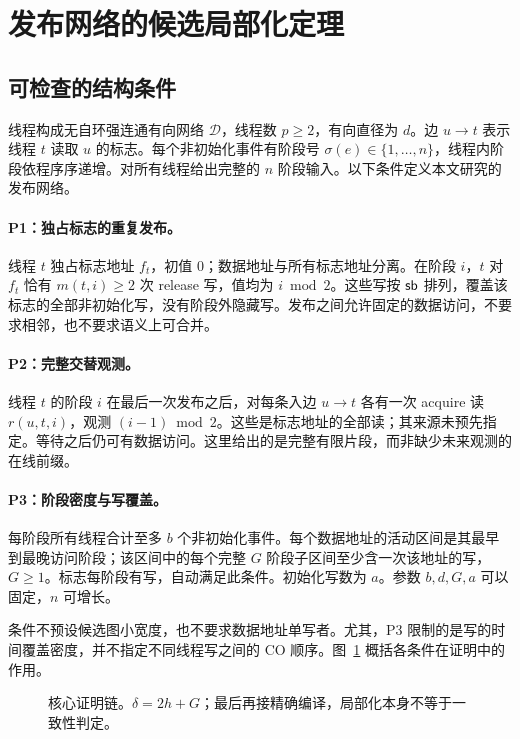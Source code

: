 \section{发布网络的候选局部化定理}\label{sec:theorem}
\subsection{可检查的结构条件}
线程构成无自环强连通有向网络 $\mathcal D$，线程数 $p\ge2$，有向直径为 $d$。边 $u\to t$ 表示线程 $t$ 读取 $u$ 的标志。每个非初始化事件有阶段号 $\sigma(e)\in\{1,\ldots,n\}$，线程内阶段依程序序递增。对所有线程给出完整的 $n$ 阶段输入。以下条件定义本文研究的发布网络。

\paragraph{P1：独占标志的重复发布。}
线程 $t$ 独占标志地址 $f_t$，初值 0；数据地址与所有标志地址分离。在阶段 $i$，$t$ 对 $f_t$ 恰有 $m(t,i)\ge2$ 次 release 写，值均为 $i\bmod2$。这些写按 $\mathsf{sb}$ 排列，覆盖该标志的全部非初始化写，没有阶段外隐藏写。发布之间允许固定的数据访问，不要求相邻，也不要求语义上可合并。

\paragraph{P2：完整交替观测。}
线程 $t$ 的阶段 $i$ 在最后一次发布之后，对每条入边 $u\to t$ 各有一次 acquire 读 $r(u,t,i)$，观测 $(i-1)\bmod2$。这些是标志地址的全部读；其来源未预先指定。等待之后仍可有数据访问。这里给出的是完整有限片段，而非缺少未来观测的在线前缀。

\paragraph{P3：阶段密度与写覆盖。}
每阶段所有线程合计至多 $b$ 个非初始化事件。每个数据地址的活动区间是其最早到最晚访问阶段；该区间中的每个完整 $G$ 阶段子区间至少含一次该地址的写，$G\ge1$。标志每阶段有写，自动满足此条件。初始化写数为 $a$。参数 $b,d,G,a$ 可以固定，$n$ 可增长。

条件不预设候选图小宽度，也不要求数据地址单写者。尤其，P3 限制的是写的时间覆盖密度，并不指定不同线程写之间的 CO 顺序。图~\ref{fig:proofchain} 概括各条件在证明中的作用。

\begin{figure}[tb]
\centering
{}
\caption{核心证明链。$\delta=2h+G$；最后再接精确编译，局部化本身不等于一致性判定。}\label{fig:proofchain}
\end{figure}

